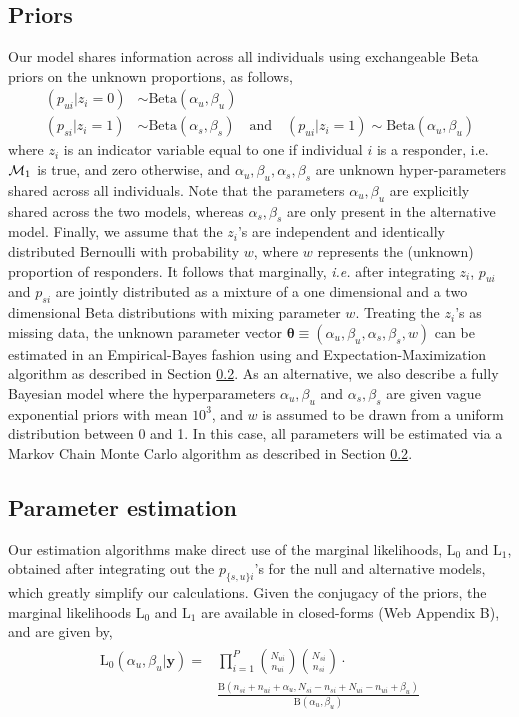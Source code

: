 \documentclass[useAMS,referee,usenatbib]{biom}
\begin{document}
\subsection{Priors}
\label{ss:priors}
Our model shares information across all individuals using exchangeable Beta priors on the unknown proportions, as follows, 
 \begin{align*}
(p_{ui} | z_{i}=0)  &\sim \mathrm{Beta}(\alpha_u, \beta_u)\\
(p_{si} | z_{i}=1)  &\sim \mathrm{Beta}(\alpha_s,\beta_s) \quad\mathrm{and}\quad (p_{ui}|z_{i}=1) \sim \mathrm{Beta}(\alpha_u, \beta_u)
 \end{align*}
where $z_i$ is an indicator variable equal to one if individual $i$ is a responder, i.e.  ${\cal M}_1$ is true, and zero otherwise, and $\alpha_u, \beta_u, \alpha_s,\beta_s$ are unknown hyper-parameters shared across all individuals. Note that the parameters $\alpha_u, \beta_u$ are explicitly shared across the two models, whereas $\alpha_s,\beta_s$ are only present in the alternative model. Finally, we assume that the $z_i$'s are independent and identically distributed Bernoulli with probability $w$, where $w$ represents the (unknown) proportion of responders. It follows that marginally, \textit{i.e.} after integrating $z_i$, $p_{ui}$ and $p_{si}$ are jointly distributed as a mixture of a one dimensional and a two dimensional Beta distributions with mixing parameter $w$. Treating the $z_i$'s as missing data, the unknown parameter vector $\boldsymbol\theta\equiv(\alpha_u, \beta_u, \alpha_s,\beta_s, w)$ can be estimated in an Empirical-Bayes fashion using and Expectation-Maximization~\citep{Dempster:1977ul} algorithm as described in Section \ref{s:estimation}. As an alternative, we also describe a fully Bayesian model where the hyperparameters $\alpha_u, \beta_u$ and $\alpha_s, \beta_s$ are given vague exponential priors with mean $10^3$, and $w$ is assumed to be drawn from a uniform distribution between 0 and 1. In this case, all parameters will be estimated via a Markov Chain Monte Carlo algorithm as described in Section \ref{s:estimation}. 

\subsection{Parameter estimation}
\label{s:estimation}
Our estimation algorithms make direct use of the marginal likelihoods, $\mathrm{L}_0$ and $\mathrm{L}_1$, obtained after integrating out the $p_{\{s,u\}i}$'s for the null and alternative models, which greatly simplify our calculations. Given the conjugacy of the priors, the marginal likelihoods $\mathrm{L}_0$ and $\mathrm{L}_1$ are available in closed-forms (Web Appendix B), and are given by,
 \begin{align*}
 \begin{split}
  	\mathrm{L}_0(\alpha_u,\beta_u|\mathbf{y})
	=&\prod_{i=1}^P\binom{N_{ui}}{n_{ui}}\binom{N_{si}}{n_{si}}\cdot\\ &\frac{\mathrm{B}(n_{si}+n_{ui}+\alpha_u,N_{si}-n_{si}+N_{ui}-n_{ui}+\beta_u)}{\mathrm{B}(\alpha_u,\beta_u)}
	\end{split}
 \end{align*} 
 
\end{document}
